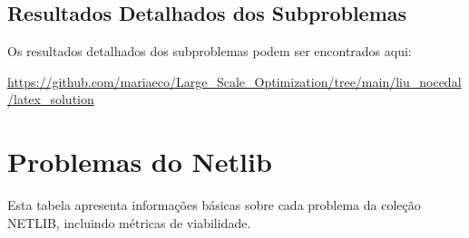 \documentclass[12pt,a4paper]{article}
\begin{document}
\subsection{Resultados Detalhados dos Subproblemas}

Os resultados detalhados dos subproblemas podem ser encontrados aqui: 

\url{https://github.com/mariaeco/Large_Scale_Optimization/tree/main/liu_nocedal/latex_solution}



\section{Problemas do Netlib}



Esta tabela apresenta informações básicas sobre cada problema da coleção NETLIB, incluindo métricas de viabilidade.
\end{document}
